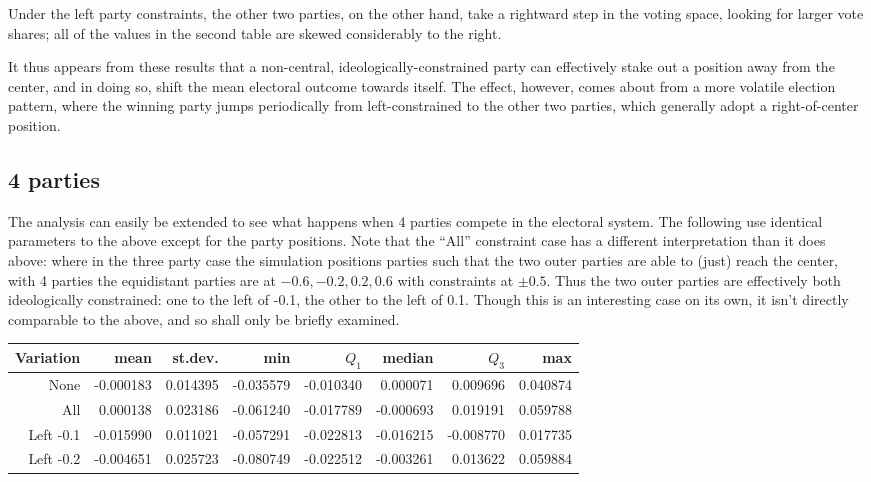 \documentclass[12pt]{article}
\numberwithin{equation}{subsection}
\begin{document}
Under the left party constraints, the other two parties, on the other hand, take a rightward step in
the voting space, looking for larger vote shares; all of the values in the second table are skewed
considerably to the right.

It thus appears from these results that a non-central, ideologically-constrained party can
effectively stake out a position away from the center, and in doing so, shift the mean electoral
outcome towards itself.  The effect, however, comes about from a more volatile election pattern,
where the winning party jumps periodically from left-constrained to the other two parties, which
generally adopt a right-of-center position.


\subsection{4 parties}

The analysis can easily be extended to see what happens when 4 parties compete in the electoral
system.  The following use identical parameters to the above except for the party positions.  Note
that the ``All'' constraint case has a different interpretation than it does above: where in the
three party case the simulation positions parties such that the two outer parties are able to (just)
reach the center, with 4 parties the equidistant parties are at $-0.6, -0.2, 0.2, 0.6$ with
constraints at $\pm 0.5$.  Thus the two outer parties are effectively both ideologically
constrained: one to the left of -0.1, the other to the left of 0.1.  Though this is an interesting
case on its own, it isn't directly comparable to the above, and so shall only be briefly examined.

\begin{tabular}{r|r|r|r|r|r|r|r}
    Variation & mean & st.dev. & min & $Q_1$ & median & $Q_3$ & max \\
    \hline
None      & -0.000183 & 0.014395 & -0.035579 & -0.010340 &  0.000071 &  0.009696 & 0.040874 \\
All       &  0.000138 & 0.023186 & -0.061240 & -0.017789 & -0.000693 &  0.019191 & 0.059788 \\
Left -0.1 & -0.015990 & 0.011021 & -0.057291 & -0.022813 & -0.016215 & -0.008770 & 0.017735 \\
Left -0.2 & -0.004651 & 0.025723 & -0.080749 & -0.022512 & -0.003261 &  0.013622 & 0.059884 \\
\end{tabular}
\end{document}
